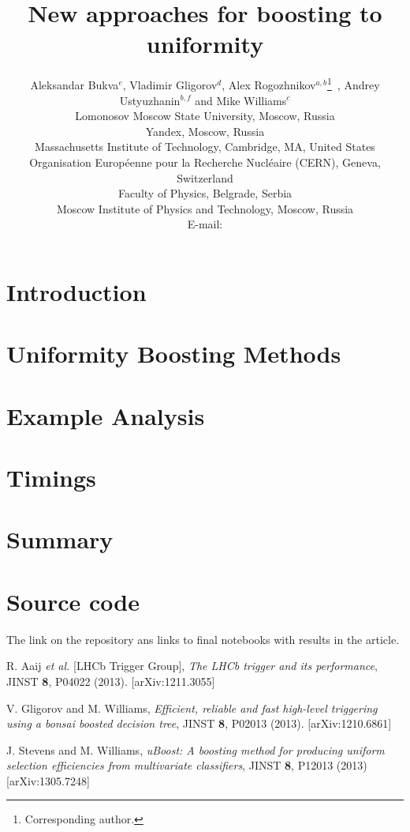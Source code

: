 \documentclass{JINST}
\title{New approaches for boosting to uniformity}
\author{
Aleksandar Bukva$^e$, 
Vladimir Gligorov$^d$,
Alex Rogozhnikov$^{a,b}$\thanks{Corresponding author.}~,\newline
Andrey Ustyuzhanin$^{b,f}$ and
Mike Williams$^c$\\
\llap{$^a$}Lomonosov Moscow State University, Moscow, Russia\\
\llap{$^b$}Yandex, Moscow, Russia\\
\llap{$^c$}Massachusetts Institute of Technology, Cambridge, MA, United States \\
\llap{$^d$}Organisation Europ\'eenne pour la Recherche Nucl\'eaire (CERN), Geneva, Switzerland  \\
\llap{$^e$}Faculty of Physics, Belgrade, Serbia \\
\llap{$^f$}Moscow Institute of Physics and Technology, Moscow, Russia\\
E-mail: \email{alex.rogozhnikov@yandex.ru}}
\theoremstyle{definition}
\theoremstyle{remark}
\begin{document}
\maketitle


\section{Introduction}



\section{Uniformity Boosting Methods}


\section{Example Analysis}




\section{Timings}



\section{Summary}



\section{Source code}


The link on the repository ans links to final notebooks with results in the article.

\acknowledgments



\begin{thebibliography}{9}

 R. Aaij {\em et al.} [LHCb Trigger Group], {\em The LHCb trigger and its performance}, JINST {\bf 8}, P04022 (2013). [arXiv:1211.3055]

  V. Gligorov and M. Williams, {\em Efficient, reliable and fast high-level triggering using a bonsai boosted decision tree}, JINST {\bf 8}, P02013 (2013). [arXiv:1210.6861]

 J. Stevens and M. Williams, {\em uBoost: A boosting method for producing uniform selection efficiencies from multivariate classifiers}, JINST {\bf 8}, P12013 (2013) [arXiv:1305.7248]


\end{thebibliography}
\end{document}

